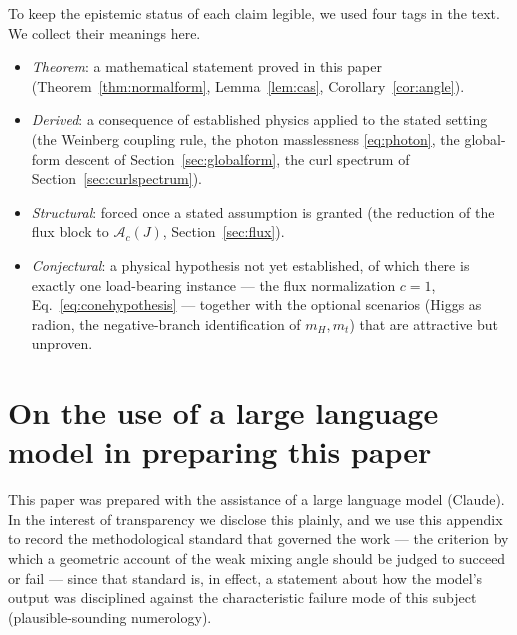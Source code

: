 \documentclass[11pt]{article}
\theoremstyle{plain}
\theoremstyle{definition}
\newcommand{\cA}{\mathcal{A}}
\begin{document}
To keep the epistemic status of each claim legible, we used four tags in the
text. We collect their meanings here.
\begin{itemize}
\item \emph{Theorem}: a mathematical statement proved in this paper
(Theorem~\ref{thm:normalform}, Lemma~\ref{lem:cas},
Corollary~\ref{cor:angle}).
\item \emph{Derived}: a consequence of established physics applied to the
stated setting (the Weinberg coupling rule, the photon masslessness
\eqref{eq:photon}, the global-form descent of Section~\ref{sec:globalform},
the curl spectrum of Section~\ref{sec:curlspectrum}).
\item \emph{Structural}: forced once a stated assumption is granted (the
reduction of the flux block to $\cA_c(J)$, Section~\ref{sec:flux}).
\item \emph{Conjectural}: a physical hypothesis not yet established, of which
there is exactly one load-bearing instance --- the flux normalization
$c=1$, Eq.~\eqref{eq:conehypothesis} --- together with the optional
scenarios (Higgs as radion, the negative-branch identification of $m_H,m_t$)
that are attractive but unproven.
\end{itemize}

\section{On the use of a large language model in preparing this paper}
\label{app:llm}

This paper was prepared with the assistance of a large language model
(Claude). In the interest of transparency we disclose this plainly, and we
use this appendix to record the methodological standard that governed the
work --- the criterion by which a geometric account of the weak mixing angle
should be judged to succeed or fail --- since that standard is, in effect, a
statement about how the model's output was disciplined against the
characteristic failure mode of this subject (plausible-sounding numerology).
\end{document}
